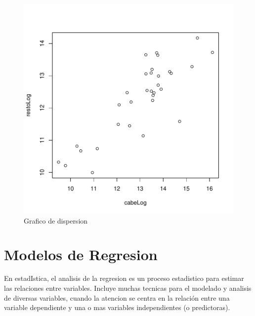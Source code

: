 \documentclass{article}
\begin{document}
\begin{figure}[h]
\includegraphics{ProyectoIntegrador-grafico}
\caption{Grafico de dispersion}
\end{figure}

\clearpage


\section{Modelos de Regresion}

En estadIstica, el analisis de la regresion es un proceso estadistico para estimar las relaciones entre variables. Incluye muchas tecnicas para el modelado y analisis de diversas variables, cuando la atencion se centra en la relación entre una variable dependiente y una o mas variables independientes (o predictoras).
\end{document}
